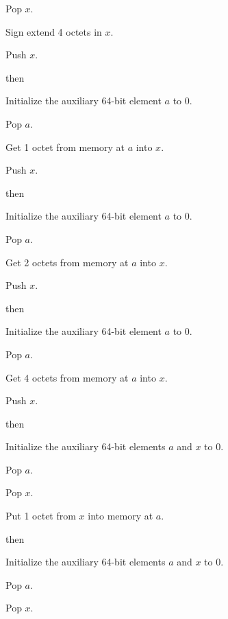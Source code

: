 \documentclass[a4paper,12pt]{article}
\newcommand{\num}[1]{\texttt{#1}\xspace}
\newcommand{\hex}[1]{\num{#1}$_{\textup{\tiny\hskip-1ex 16}}$\xspace}
\newcommand{\op}[1]{#1}
\newcommand{\LOADB}     [1]{\op{\hex{10}}}
\newcommand{\LOADS}     [1]{\op{\hex{11}}}
\newcommand{\LOADI}     [1]{\op{\hex{12}}}
\newcommand{\STOREB}    [1]{\op{\hex{14}}}
\newcommand{\STORES}    [1]{\op{\hex{15}}}
\begin{document}
\begin{stepnumbers}[start=3]
\begin{description}
\begin{stepnumbers}
    \item Pop $x$.
    \item Sign extend 4 octets in $x$.
    \item Push $x$.
    \end{stepnumbers}
  \item[\LOADB{}] then
    \begin{stepnumbers}
    \item Initialize the auxiliary 64-bit element $a$ to 0.
    \item Pop $a$.
    \item Get 1 octet from memory at $a$ into $x$.
    \item Push $x$.
    \end{stepnumbers}
  \item[\LOADS{}] then
    \begin{stepnumbers}
    \item Initialize the auxiliary 64-bit element $a$ to 0.
    \item Pop $a$.
    \item Get 2 octets from memory at $a$ into $x$.
    \item Push $x$.
    \end{stepnumbers}
  \item[\LOADI{}] then
    \begin{stepnumbers}
    \item Initialize the auxiliary 64-bit element $a$ to 0.
    \item Pop $a$.
    \item Get 4 octets from memory at $a$ into $x$.
    \item Push $x$.
    \end{stepnumbers}
  \item[\STOREB{}] then
    \begin{stepnumbers}
    \item Initialize the auxiliary 64-bit elements $a$ and $x$ to 0.
    \item Pop $a$.
    \item Pop $x$.
    \item Put 1 octet from $x$ into memory at $a$.
    \end{stepnumbers}
  \item[\STORES{}] then
    \begin{stepnumbers}
    \item Initialize the auxiliary 64-bit elements $a$ and $x$ to 0.
    \item Pop $a$.
    \item Pop $x$.

\end{stepnumbers}
\end{description}
\end{stepnumbers}
\end{document}
